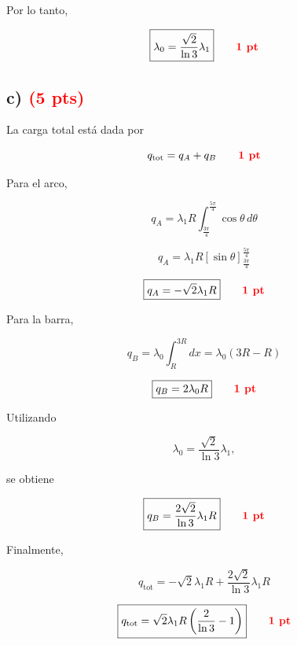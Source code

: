 \documentclass[12pt]{article}
\begin{document}
Por lo tanto,

\[
\boxed{
\lambda_0
=
\frac{\sqrt{2}}{\ln3}\lambda_1
}
\qquad
\textcolor{red}{\textbf{1 pt}}
\]


\subsection*{c) \hfill \textcolor{red}{\textbf{(5 pts)}}}

La carga total está dada por

\[
q_{\text{tot}}
=
q_A+q_B
\qquad
\textcolor{red}{\textbf{1 pt}}
\]

Para el arco,

\[
q_A
=
\lambda_1R
\int_{\frac{3\pi}{4}}^{\frac{5\pi}{4}}
\cos\theta\,d\theta
\]

\[
q_A
=
\lambda_1R
\left[
\sin\theta
\right]_{\frac{3\pi}{4}}^{\frac{5\pi}{4}}
\]

\[
\boxed{
q_A=-\sqrt{2}\lambda_1R
}
\qquad
\textcolor{red}{\textbf{1 pt}}
\]

Para la barra,

\[
q_B
=
\lambda_0
\int_R^{3R}dx
=
\lambda_0(3R-R)
\]

\[
\boxed{
q_B=2\lambda_0R
}
\qquad
\textcolor{red}{\textbf{1 pt}}
\]

Utilizando

\[
\lambda_0
=
\frac{\sqrt{2}}{\ln3}\lambda_1,
\]

se obtiene

\[
\boxed{
q_B
=
\frac{2\sqrt{2}}{\ln3}\lambda_1R
}
\qquad
\textcolor{red}{\textbf{1 pt}}
\]

Finalmente,

\[
q_{\text{tot}}
=
-\sqrt{2}\lambda_1R
+
\frac{2\sqrt{2}}{\ln3}\lambda_1R
\]

\[
\boxed{
q_{\text{tot}}
=
\sqrt{2}\lambda_1R
\left(
\frac{2}{\ln3}-1
\right)
}
\qquad
\textcolor{red}{\textbf{1 pt}}
\]
\end{document}
